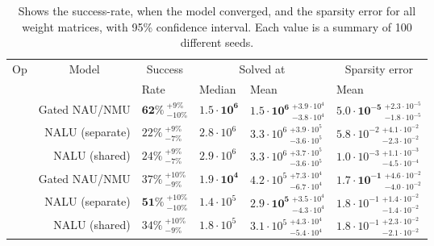 \begin{table}[!h]

\caption{\label{tab:simple-function-static-nalu-gate-table}Shows the success-rate, when the model converged, and the sparsity error for all weight matrices, with 95\% confidence interval. Each value is a summary of 100 different seeds.}
\centering
\begin{tabular}{crllll}
\toprule
\multicolumn{1}{c}{Op} & \multicolumn{1}{c}{Model} & \multicolumn{1}{c}{Success} & \multicolumn{2}{c}{Solved at} & \multicolumn{1}{c}{Sparsity error} \\
\cmidrule(l{3pt}r{3pt}){1-1} \cmidrule(l{3pt}r{3pt}){2-2} \cmidrule(l{3pt}r{3pt}){3-3} \cmidrule(l{3pt}r{3pt}){4-5} \cmidrule(l{3pt}r{3pt}){6-6}
 &  & Rate & Median & Mean & Mean\\
\midrule
 & Gated NAU/NMU & $\mathbf{62\%} {~}^{+9\%}_{-10\%}$ & $\mathbf{1.5 \cdot 10^{6}}$ & $\mathbf{1.5 \cdot 10^{6}} {~}^{+3.9 \cdot 10^{4}}_{-3.8 \cdot 10^{4}}$ & $\mathbf{5.0 \cdot 10^{-5}} {~}^{+2.3 \cdot 10^{-5}}_{-1.8 \cdot 10^{-5}}$\\

\nopagebreak
 & NALU (separate) & $22\% {~}^{+9\%}_{-7\%}$ & $2.8 \cdot 10^{6}$ & $3.3 \cdot 10^{6} {~}^{+3.9 \cdot 10^{5}}_{-3.6 \cdot 10^{5}}$ & $5.8 \cdot 10^{-2} {~}^{+4.1 \cdot 10^{-2}}_{-2.3 \cdot 10^{-2}}$\\

\nopagebreak
\multirow{-3}{*}{\centering\arraybackslash $\bm{\times}$} & NALU (shared) & $24\% {~}^{+9\%}_{-7\%}$ & $2.9 \cdot 10^{6}$ & $3.3 \cdot 10^{6} {~}^{+3.7 \cdot 10^{5}}_{-3.6 \cdot 10^{5}}$ & $1.0 \cdot 10^{-3} {~}^{+1.1 \cdot 10^{-3}}_{-4.5 \cdot 10^{-4}}$\\
\cmidrule{1-6}
 & Gated NAU/NMU & $37\% {~}^{+10\%}_{-9\%}$ & $\mathbf{1.9 \cdot 10^{4}}$ & $4.2 \cdot 10^{5} {~}^{+7.3 \cdot 10^{4}}_{-6.7 \cdot 10^{4}}$ & $\mathbf{1.7 \cdot 10^{-1}} {~}^{+4.6 \cdot 10^{-2}}_{-4.0 \cdot 10^{-2}}$\\

\nopagebreak
 & NALU (separate) & $\mathbf{51\%} {~}^{+10\%}_{-10\%}$ & $1.4 \cdot 10^{5}$ & $\mathbf{2.9 \cdot 10^{5}} {~}^{+3.5 \cdot 10^{4}}_{-4.3 \cdot 10^{4}}$ & $1.8 \cdot 10^{-1} {~}^{+1.4 \cdot 10^{-2}}_{-1.4 \cdot 10^{-2}}$\\

\nopagebreak
\multirow{-3}{*}{\centering\arraybackslash $\bm{+}$} & NALU (shared) & $34\% {~}^{+10\%}_{-9\%}$ & $1.8 \cdot 10^{5}$ & $3.1 \cdot 10^{5} {~}^{+4.3 \cdot 10^{4}}_{-5.4 \cdot 10^{4}}$ & $1.8 \cdot 10^{-1} {~}^{+2.3 \cdot 10^{-2}}_{-2.1 \cdot 10^{-2}}$\\
\bottomrule
\end{tabular}
\end{table}
